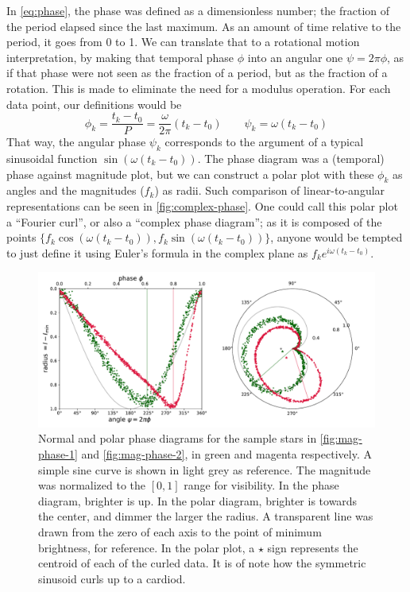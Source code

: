 	In \autoref{eq:phase}, the phase was defined as a dimensionless number; the fraction of the period elapsed since the last maximum.
	As an amount of time relative to the period, it goes from 0 to 1.
	We can translate that to a rotational motion interpretation, by making that temporal phase $\phi$ into an angular one $\psi=2\pi \phi$,
	as if that phase were not seen as the fraction of a period, but as the fraction of a rotation.
	This is made to eliminate the need for a modulus operation. For each data point, our definitions would be
	$$
	\phi_k = \frac{t_k-t_0}{P} = \frac{\omega}{2\pi}(t_k-t_0) \qquad \psi_k = \omega(t_k-t_0)
	$$
	That way, the angular phase $\psi_k$ corresponds to the argument of a typical sinusoidal function $\sin(\omega(t_k-t_0))$.
	The phase diagram was a (temporal) phase against magnitude plot, but we can construct a polar plot with these $\phi_k$ as angles and the magnitudes ($f_k$) as radii.
	Such comparison of linear-to-angular representations can be seen in \autoref{fig:complex-phase}.
	One could call this polar plot a \enquote{Fourier curl}, or also a \enquote{complex phase diagram};
	as it is composed of the points $\{f_k \cos(\omega(t_k-t_0)),f_k \sin(\omega(t_k-t_0))\}$, 
	anyone would be tempted to just define it using Euler's formula in the complex plane as $f_k e^{i \omega (t_k-t_0)}$.
	
	\begin{figure}
		\centering
		\includegraphics[width=\textwidth]{img/complex_phase.pdf}
		\caption[Complex phase diagram: Fourier curl]{
			Normal and polar phase diagrams for the sample stars in \autoref{fig:mag-phase-1} and \ref{fig:mag-phase-2}, 
			in green and magenta respectively. A simple sine curve is shown in light grey as reference.
			The magnitude was normalized to the $[0,1]$ range for visibility. 
			In the phase diagram, brighter is up. In the polar diagram, brighter is towards the center, and dimmer the larger the radius.
			A transparent line was drawn from the zero of each axis to the point of minimum brightness, for reference.
			In the polar plot, a $\star$ sign represents the centroid of each of the curled data.
			It is of note how the symmetric sinusoid curls up to a cardiod.
		}
		\label{fig:complex-phase}
	\end{figure}
	
